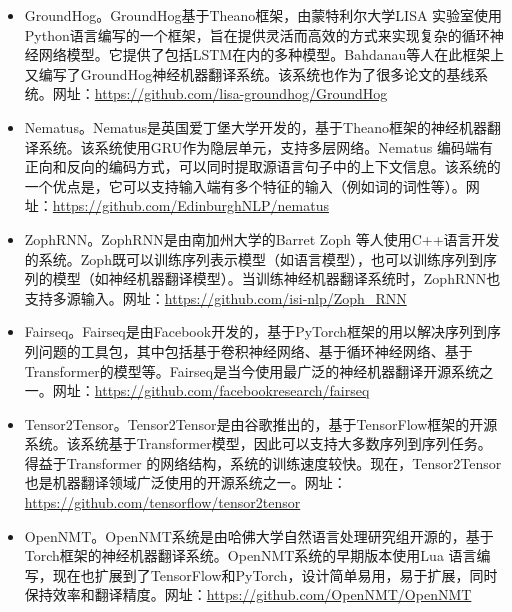 \begin{appendices}
\begin{itemize}
\vspace{0.5em}
\item GroundHog。GroundHog基于Theano框架，由蒙特利尔大学LISA 实验室使用Python语言编写的一个框架，旨在提供灵活而高效的方式来实现复杂的循环神经网络模型。它提供了包括LSTM在内的多种模型。Bahdanau等人在此框架上又编写了GroundHog神经机器翻译系统。该系统也作为了很多论文的基线系统。网址：\url{https://github.com/lisa-groundhog/GroundHog}
\vspace{0.5em}
\item Nematus。Nematus是英国爱丁堡大学开发的，基于Theano框架的神经机器翻译系统。该系统使用GRU作为隐层单元，支持多层网络。Nematus 编码端有正向和反向的编码方式，可以同时提取源语言句子中的上下文信息。该系统的一个优点是，它可以支持输入端有多个特征的输入（例如词的词性等）。网址：\url{https://github.com/EdinburghNLP/nematus}
\vspace{0.5em}
\item ZophRNN。ZophRNN是由南加州大学的Barret Zoph 等人使用C++语言开发的系统。Zoph既可以训练序列表示模型（如语言模型），也可以训练序列到序列的模型（如神经机器翻译模型）。当训练神经机器翻译系统时，ZophRNN也支持多源输入。网址：\url{https://github.com/isi-nlp/Zoph\_RNN}
\vspace{0.5em}
\item Fairseq。Fairseq是由Facebook开发的，基于PyTorch框架的用以解决序列到序列问题的工具包，其中包括基于卷积神经网络、基于循环神经网络、基于Transformer的模型等。Fairseq是当今使用最广泛的神经机器翻译开源系统之一。网址：\url{https://github.com/facebookresearch/fairseq}
\vspace{0.5em}
\item Tensor2Tensor。Tensor2Tensor是由谷歌推出的，基于TensorFlow框架的开源系统。该系统基于Transformer模型，因此可以支持大多数序列到序列任务。得益于Transformer 的网络结构，系统的训练速度较快。现在，Tensor2Tensor也是机器翻译领域广泛使用的开源系统之一。网址：\url{https://github.com/tensorflow/tensor2tensor}
\vspace{0.5em}
\item OpenNMT。OpenNMT系统是由哈佛大学自然语言处理研究组开源的，基于Torch框架的神经机器翻译系统。OpenNMT系统的早期版本使用Lua 语言编写，现在也扩展到了TensorFlow和PyTorch，设计简单易用，易于扩展，同时保持效率和翻译精度。网址：\url{https://github.com/OpenNMT/OpenNMT}
\vspace{0.5em}

\end{itemize}
\end{appendices}
